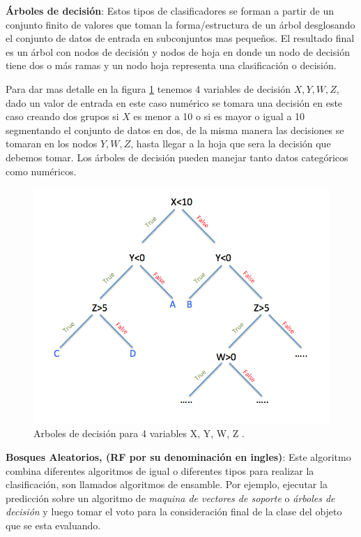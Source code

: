 \par \textbf{Árboles de decisión}: Estos tipos de clasificadores se forman a partir de  un conjunto finito de valores  que toman la forma/estructura de un árbol desglosando el conjunto de datos de entrada en subconjuntos mas pequeños. El resultado final es un árbol con nodos de decisión y nodos de hoja en donde un nodo de decisión tiene dos o más ramas y un nodo hoja representa una clasificación o decisión. 

Para dar mas detalle en la figura \ref{Fig: decision-tree} tenemos 4 variables de decisión $ X, Y, W, Z$, dado un valor  de entrada en este caso numérico se tomara una decisión en este caso creando dos grupos  si $ X$  es menor a 10 o si es mayor o igual a 10 segmentando el conjunto de datos en dos, de la misma manera las decisiones se tomaran en los nodos $ Y, W, Z$, hasta llegar a la hoja que sera la decisión que debemos tomar. Los árboles de decisión pueden manejar tanto datos categóricos como numéricos.

  
\begin{figure}[H]
 \centering
  \includegraphics[scale=0.3,keepaspectratio=true,clip=true]{imagenes/MarcoTeorico/decision-tree.png}
  \caption{Arboles de decisión para 4 variables X, Y, W, Z .}%
  \label{Fig: decision-tree}
\end{figure}


\par \textbf{Bosques Aleatorios, (RF por su denominación en ingles)}: Este  algoritmo combina diferentes algoritmos de igual o diferentes tipos para realizar la clasificación, son llamados algoritmos de ensamble. Por ejemplo, ejecutar la predicción sobre un algoritmo de \textit{maquina de vectores de soporte} o  \textit{árboles de decisión} y luego tomar el voto para la consideración final de la clase del objeto que se esta evaluando.  

